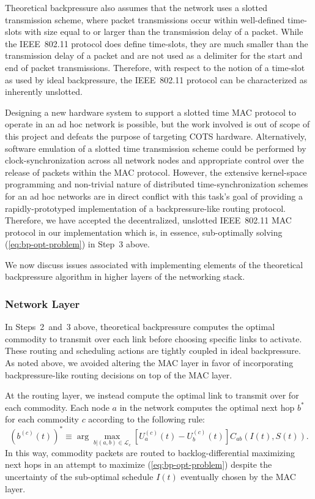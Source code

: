 \documentclass{article}
\begin{document}
Theoretical backpressure also assumes that the network uses a slotted transmission scheme, where packet transmissions occur within well-defined time-slots with size equal to or larger than the transmission delay of a packet.
While the IEEE~802.11 protocol does define time-slots, they are much smaller than the transmission delay of a packet and are not used as a delimiter for the start and end of packet transmissions.
Therefore, with respect to the notion of a time-slot as used by ideal backpressure, the IEEE~802.11 protocol can be characterized as inherently unslotted.


Designing a new hardware system to support a slotted time MAC protocol to operate in an ad hoc network is possible, but the work involved is out of scope of this project and defeats the purpose of targeting COTS hardware.
Alternatively, software emulation of a slotted time transmission scheme could be performed by clock-synchronization across all network nodes and appropriate control over the release of packets within the MAC protocol.
However, the extensive kernel-space programming and non-trivial nature of distributed time-synchronization schemes for an ad hoc networks are in direct conflict with this task's goal of providing a rapidly-prototyped implementation of a backpressure-like routing protocol.
Therefore, we have accepted the decentralized, unslotted IEEE~802.11 MAC protocol in our implementation which is, in essence, sub-optimally solving (\ref{eq:bp-opt-problem}) in Step~3 above.


We now discuss issues associated with implementing elements of the theoretical backpressure algorithm in higher layers of the networking stack.


\subsubsection{Network Layer}

In Steps~2~and~3 above, theoretical backpressure computes the optimal commodity to transmit over each link before choosing specific links to activate.
These routing and scheduling actions are tightly coupled in ideal backpressure.
As noted above, we avoided altering the MAC layer in favor of incorporating backpressure-like routing decisions on top of the MAC layer.


At the routing layer, we instead compute the optimal link to transmit over for each commodity.
Each node \(a\) in the network computes the optimal next hop \(b^*\) for each commodity \(c\) according to the following rule:
%
\begin{equation}
  \label{eq:opt-nexthop}
  \left(b^{(c)}(t)\right)^* \equiv \arg\max_{b|(a,b)\in \mathcal{L}_c}\left[U_{a}^{(c)}(t) - U_{b}^{(c)}(t)\right]C_{ab}(I(t),S(t)).
\end{equation}
%
In this way, commodity packets are routed to backlog-differential maximizing next hops in an attempt to maximize (\ref{eq:bp-opt-problem}) despite the uncertainty of the sub-optimal schedule \(I(t)\) eventually chosen by the MAC layer.
\end{document}

